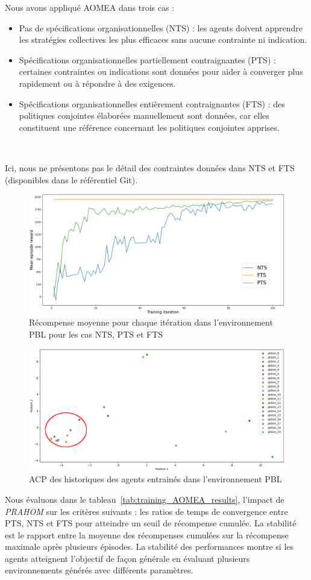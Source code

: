 \documentclass[contribution]{jfsma}
\begin{document}
Nous avons appliqué AOMEA dans trois cas :
\begin{itemize}
  \item Pas de spécifications organisationnelles (NTS) : les agents doivent apprendre les stratégies collectives les plus efficaces sans aucune contrainte ni indication.
  \item Spécifications organisationnelles partiellement contraignantes (PTS) : certaines contraintes ou indications sont données pour aider à converger plus rapidement ou à répondre à des exigences.
  \item Spécifications organisationnelles entièrement contraignantes (FTS) : des politiques conjointes élaborées manuellement sont données, car elles constituent une référence concernant les politiques conjointes apprises.
\end{itemize}

\

\noindent Ici, nous ne présentons pas le détail des contraintes données dans NTS et FTS (disponibles dans le référentiel Git\footnotemark[1]).
%
\begin{figure}[h!]
  \centering
  \includegraphics[width=0.76\linewidth]{figures/prahom_learning_curve.png}
  \caption{Récompense moyenne pour chaque itération dans l'environnement PBL pour les cas NTS, PTS et FTS}
  \label{fig:prahom_learning_curve}
\end{figure}
%
\begin{figure}[h!]
  \centering
  \includegraphics[width=0.75\linewidth]{figures/prahom_pca_analysis.png}
  \caption{ACP des historiques des agents entrainés dans l'environnement PBL}
  \label{fig:prahom_pca_analysis}
\end{figure}
%
Nous évaluons dans le tableau~\ref{tab:training_AOMEA_results}, l'impact de \emph{PRAHOM} sur les critères suivants : les ratios de temps de convergence entre PTS, NTS et FTS pour atteindre un seuil de récompense cumulée. La stabilité est le rapport entre la moyenne des récompenses cumulées sur la récompense maximale après plusieurs épisodes. La stabilité des performances montre si les agents atteignent l'objectif de façon générale en évaluant plusieurs environnements générés avec différents paramètres.
\end{document}

